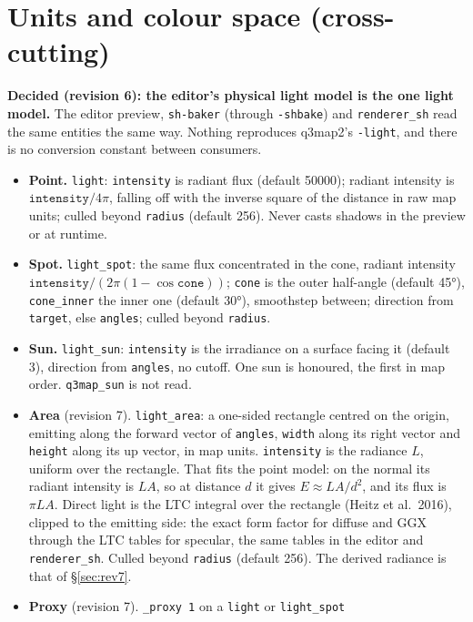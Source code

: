 \documentclass[11pt,a4paper]{article}
\begin{document}
\section{Units and colour space (cross-cutting)}\label{sec:units}

\textbf{Decided (revision 6): the editor's physical light model is the one light model.} The
editor preview, \texttt{sh-baker} (through \texttt{-shbake}) and \texttt{renderer\_sh} read the same
entities the same way. Nothing reproduces q3map2's \texttt{-light}, and there is no conversion
constant between consumers.
\begin{itemize}
\item \textbf{Point.} \texttt{light}: \texttt{intensity} is radiant flux (default 50000); radiant
  intensity is $\texttt{intensity}/4\pi$, falling off with the inverse square of the distance in raw
  map units; culled beyond \texttt{radius} (default 256). Never casts shadows in the preview or at
  runtime.
\item \textbf{Spot.} \texttt{light\_spot}: the same flux concentrated in the cone, radiant intensity
  $\texttt{intensity}/(2\pi(1-\cos\texttt{cone}))$; \texttt{cone} is the outer half-angle (default
  45°), \texttt{cone\_inner} the inner one (default 30°), smoothstep between; direction from
  \texttt{target}, else \texttt{angles}; culled beyond \texttt{radius}.
\item \textbf{Sun.} \texttt{light\_sun}: \texttt{intensity} is the irradiance on a surface facing it
  (default 3), direction from \texttt{angles}, no cutoff. One sun is honoured, the first in map
  order. \texttt{q3map\_sun} is not read.
\item \textbf{Area} (revision 7). \texttt{light\_area}: a one-sided rectangle centred on the
  origin, emitting along the forward vector of \texttt{angles}, \texttt{width} along its right
  vector and \texttt{height} along its up vector, in map units. \texttt{intensity} is the radiance
  $L$, uniform over the rectangle. That fits the point model: on the normal its radiant intensity is
  $LA$, so at distance $d$ it gives $E \approx LA/d^2$, and its flux is $\pi LA$. Direct light is the
  LTC integral over the rectangle (Heitz et al.\ 2016), clipped to the emitting side: the exact
  form factor for diffuse and GGX through the LTC tables for specular, the same tables in the editor
  and \texttt{renderer\_sh}. Culled beyond \texttt{radius} (default 256). The derived radiance is
  that of §\ref{sec:rev7}.
\item \textbf{Proxy} (revision 7). \texttt{\_proxy 1} on a \texttt{light} or \texttt{light\_spot}

\end{itemize}
\end{document}

